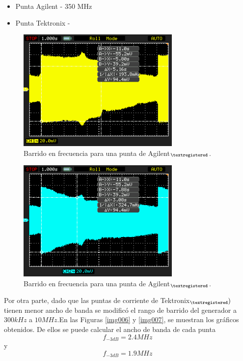 \documentclass[a4paper,10pt]{article}
\begin{document}
		\begin{itemize}
			\item Punta Agilent - 350 MHz
			\item Punta Tektronix - 
		\end{itemize}

		\begin{figure}[!htb]
			\centering
			\includegraphics[width=8cm]
			{Imagenes/Mediciones instrumentos/NewFile5.png}
			\caption{Barrido en frecuencia para una punta de 
			Agilent$_{\textregistered}$.} \label{img004}
		\end{figure}
		
		\begin{figure}[!htb]
			\centering
			\includegraphics[width=8cm]
			{Imagenes/Mediciones instrumentos/NewFile6.png}
			\caption{Barrido en frecuencia para una punta de 
			Agilent$_{\textregistered}$.} \label{img005}
		\end{figure}				
		
		\indent Por otra parte, dado que las puntas de corriente de 
		Tektronix$_{\textregistered} )$ tienen menor ancho de banda se 
		modific\'o el rango de barrido del generador a $300kHz$ a $10MHz$.En 
		las Figuras \ref{img006} y \ref{img007}, se muestran los gr\'aficos 
		obtenidos. De ellos se puede calcular el ancho de banda de cada punta
		$$f_{-3dB}=2.4MHz$$ y $$f_{-3dB}=1.9MHz$$
		
\end{document}
